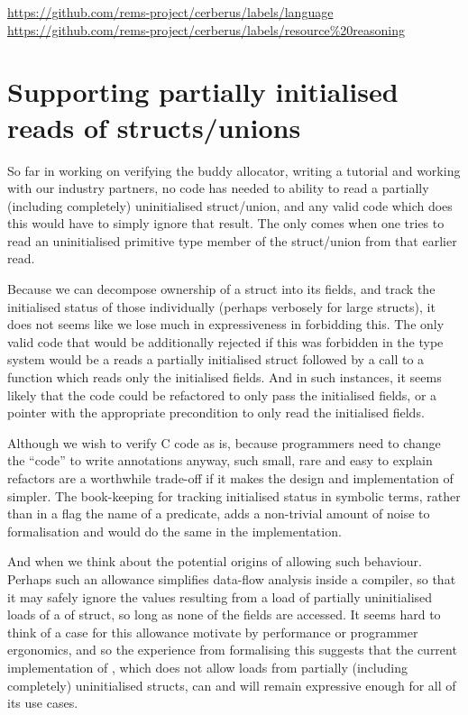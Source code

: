 \url{https://github.com/rems-project/cerberus/labels/language}
\url{https://github.com/rems-project/cerberus/labels/resource\%20reasoning}

\section{Supporting partially initialised reads of structs/unions}

So far in working on verifying the buddy allocator, writing a tutorial and
working with our industry partners, no code has needed to ability to read a
partially (including completely) uninitialised struct/union, and any valid code
which does this would have to simply ignore that result. The  only comes
when one tries to read an uninitialised primitive type member of the
struct/union from that earlier read.

Because we can decompose ownership of a struct into its fields, and track the
initialised status of those individually (perhaps verbosely for large structs),
it does not seems like we lose much in expressiveness in forbidding this. The
only valid code that would be additionally rejected if this was forbidden in
the type system would be a reads a partially initialised struct followed by a
call to a function which reads only the initialised fields. And in such
instances, it seems likely that the code could be refactored to only pass the
initialised fields, or a pointer with the appropriate precondition to only read
the initialised fields.

Although we wish to verify C code as is, because programmers need to change the
``code'' to write annotations anyway, such small, rare and easy to explain
refactors are a worthwhile trade-off if it makes the design and implementation
of  simpler. The book-keeping for tracking initialised status in
symbolic terms, rather than in a flag the name of a predicate, adds a
non-trivial amount of noise to formalisation and would do the same in the
implementation.

And when we think about the potential origins of allowing such behaviour.
Perhaps such an allowance simplifies data-flow analysis inside a compiler, so
that it may safely ignore the values resulting from a load of partially
uninitialised loads of a of struct, so long as none of the fields are accessed.
It seems hard to think of a case for this allowance motivate by performance or
programmer ergonomics, and so the experience from formalising this suggests
that the current implementation of , which does not allow loads from
partially (including completely) uninitialised structs, can and will remain
expressive enough for all of its use cases.

